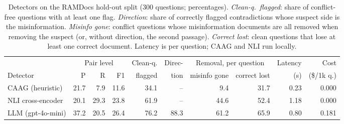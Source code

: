 \begin{table}[t]
\centering\small
\begin{tabular}{lrrrrrrrrr}
\toprule
& \multicolumn{3}{c}{Pair level} & Clean-q. & Direc- & \multicolumn{2}{c}{Removal, per question} & Latency & Cost \\
\cmidrule(lr){2-4}\cmidrule(lr){7-8}
Detector & P & R & F1 & flagged & tion & misinfo gone & correct lost & (s) & (\$/1k q.) \\
\midrule
CAAG (heuristic) & 21.7 & 7.9 & 11.6 & 34.1 & -- & 9.4 & 31.7 & 0.23 & 0.000 \\
NLI cross-encoder & 20.1 & 29.3 & 23.8 & 61.9 & -- & 44.6 & 52.4 & 1.18 & 0.000 \\
LLM (gpt-4o-mini) & 37.2 & 20.5 & 26.4 & 76.2 & 88.3 & 61.2 & 65.9 & 0.80 & 0.181 \\
\bottomrule
\end{tabular}
\caption{Detectors on the RAMDocs hold-out split (300 questions; percentages). \emph{Clean-q.\ flagged}: share of
conflict-free questions with at least one flag. \emph{Direction}: share of correctly flagged contradictions whose suspect
side is the misinformation. \emph{Misinfo gone}: conflict questions whose misinformation documents are all removed
when removing the suspect (or, without direction, the second passage). \emph{Correct lost}: clean questions that lose
at least one correct document. Latency is per question; CAAG and NLI run locally.}
\label{tab:detectors}
\end{table}
